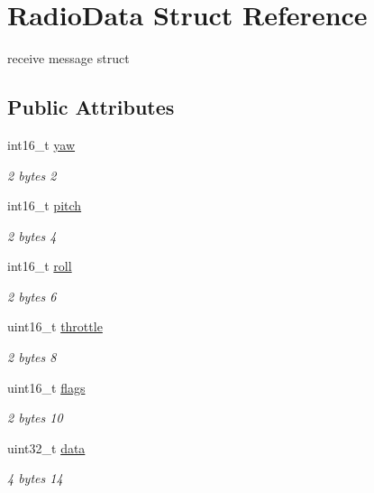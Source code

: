 \hypertarget{structRadioData}{}\section{Radio\+Data Struct Reference}
\label{structRadioData}


receive message struct  


\subsection*{Public Attributes}
\begin{DoxyCompactItemize}
\item 
int16\+\_\+t \mbox{\hyperlink{structRadioData_a241a1c2bfcf77c02542c9f71dfc3f29e}{yaw}}
\begin{DoxyCompactList}\small\item\em 2 bytes 2 \end{DoxyCompactList}\item 
int16\+\_\+t \mbox{\hyperlink{structRadioData_a88551ed8975dd848369ddf8f3511743c}{pitch}}
\begin{DoxyCompactList}\small\item\em 2 bytes 4 \end{DoxyCompactList}\item 
int16\+\_\+t \mbox{\hyperlink{structRadioData_a37f0ff8a110b97904c5e82fd907003ae}{roll}}
\begin{DoxyCompactList}\small\item\em 2 bytes 6 \end{DoxyCompactList}\item 
uint16\+\_\+t \mbox{\hyperlink{structRadioData_a21c133a1b58627f5386f5652400f0931}{throttle}}
\begin{DoxyCompactList}\small\item\em 2 bytes 8 \end{DoxyCompactList}\item 
uint16\+\_\+t \mbox{\hyperlink{structRadioData_a9f2953e3cc37197626626a999842e74d}{flags}}
\begin{DoxyCompactList}\small\item\em 2 bytes 10 \end{DoxyCompactList}\item 
uint32\+\_\+t \mbox{\hyperlink{structRadioData_a81f0599626e9bd8e665e121e93fb2828}{data}}
\begin{DoxyCompactList}\small\item\em 4 bytes 14 \end{DoxyCompactList}\end{DoxyCompactItemize}


